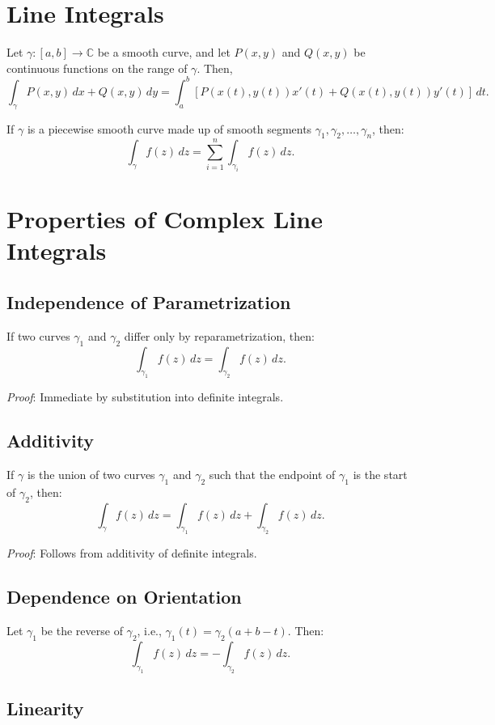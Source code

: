 \documentclass[12pt]{article}
\theoremstyle{definition} %
\theoremstyle{plain} %
\begin{document}
\section*{Line Integrals}

Let $\gamma: [a,b] \to \mathbb{C}$ be a smooth curve, and let $P(x,y)$ and $Q(x,y)$ be continuous functions on the range of $\gamma$. Then,
\[
\int_\gamma P(x,y)\,dx + Q(x,y)\,dy = \int_a^b \left[ P(x(t), y(t))x'(t) + Q(x(t), y(t))y'(t) \right]\,dt.
\]

If $\gamma$ is a piecewise smooth curve made up of smooth segments $\gamma_1, \gamma_2, \dots, \gamma_n$, then:
\[
\int_\gamma f(z)\,dz = \sum_{i=1}^n \int_{\gamma_i} f(z)\,dz.
\]
\section*{Properties of Complex Line Integrals}

\subsection*{Independence of Parametrization}

If two curves $\gamma_1$ and $\gamma_2$ differ only by reparametrization, then:
\[
\int_{\gamma_1} f(z)\,dz = \int_{\gamma_2} f(z)\,dz.
\]

\textit{Proof}: Immediate by substitution into definite integrals.

\subsection*{Additivity}

If $\gamma$ is the union of two curves $\gamma_1$ and $\gamma_2$ such that the endpoint of $\gamma_1$ is the start of $\gamma_2$, then:
\[
\int_{\gamma} f(z)\,dz = \int_{\gamma_1} f(z)\,dz + \int_{\gamma_2} f(z)\,dz.
\]

\textit{Proof}: Follows from additivity of definite integrals.

\subsection*{Dependence on Orientation}

Let $\gamma_1$ be the reverse of $\gamma_2$, i.e., $\gamma_1(t) = \gamma_2(a + b - t)$. Then:
\[
\int_{\gamma_1} f(z)\,dz = -\int_{\gamma_2} f(z)\,dz.
\]

\subsection*{Linearity}
\end{document}
